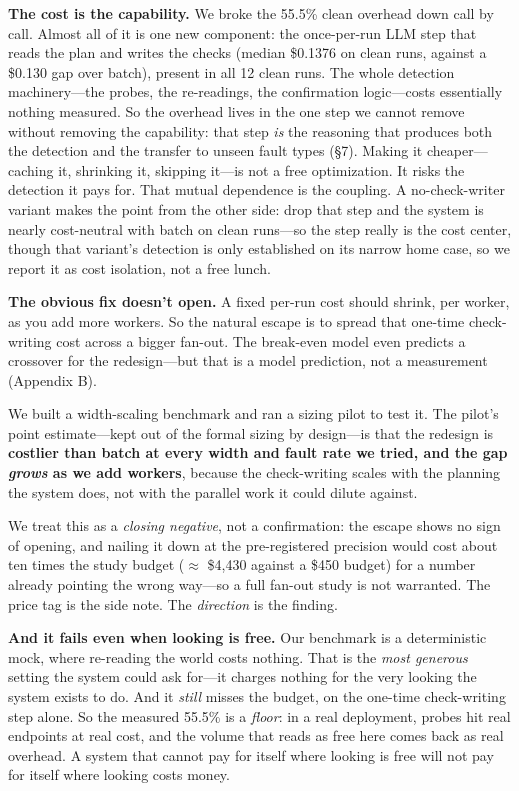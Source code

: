 \documentclass[acmsmall,screen]{acmart}
\begin{document}
\textbf{The cost is the capability.} We broke the 55.5\% clean overhead down
call by call. Almost all of it is one new component: the once-per-run LLM step
that reads the plan and writes the checks (median \$0.1376 on clean runs,
against a \$0.130 gap over batch), present in all 12 clean runs. The whole
detection machinery---the probes, the re-readings, the confirmation
logic---costs essentially nothing measured. So the overhead lives in the one
step we cannot remove without removing the capability: that step \emph{is} the
reasoning that produces both the detection and the transfer to unseen fault
types (\S7). Making it cheaper---caching it, shrinking it, skipping it---is not a
free optimization. It risks the detection it pays for. That mutual dependence is
the coupling. A no-check-writer variant makes the point from the other side:
drop that step and the system is nearly cost-neutral with batch on clean
runs---so the step really is the cost center, though that variant's detection is
only established on its narrow home case, so we report it as cost isolation, not
a free lunch.

\textbf{The obvious fix doesn't open.} A fixed per-run cost should shrink, per
worker, as you add more workers. So the natural escape is to spread that
one-time check-writing cost across a bigger fan-out. The break-even model even
predicts a crossover for the redesign---but that is a model prediction, not a
measurement (Appendix B).

We built a width-scaling benchmark and ran a sizing pilot to test it. The
pilot's point estimate---kept out of the formal sizing by design---is that the
redesign is \textbf{costlier than batch at every width and fault rate we tried,
and the gap \emph{grows} as we add workers}, because the check-writing scales
with the planning the system does, not with the parallel work it could dilute
against.

We treat this as a \emph{closing negative}, not a confirmation: the escape shows
no sign of opening, and nailing it down at the pre-registered precision would
cost about ten times the study budget ($\approx$ \$4,430 against a \$450 budget)
for a number already pointing the wrong way---so a full fan-out study is not
warranted. The price tag is the side note. The \emph{direction} is the finding.

\textbf{And it fails even when looking is free.} Our benchmark is a
deterministic mock, where re-reading the world costs nothing. That is the
\emph{most generous} setting the system could ask for---it charges nothing for
the very looking the system exists to do. And it \emph{still} misses the budget,
on the one-time check-writing step alone. So the measured 55.5\% is a
\emph{floor}: in a real deployment, probes hit real endpoints at real cost, and
the volume that reads as free here comes back as real overhead. A system that
cannot pay for itself where looking is free will not pay for itself where
looking costs money.
\end{document}
